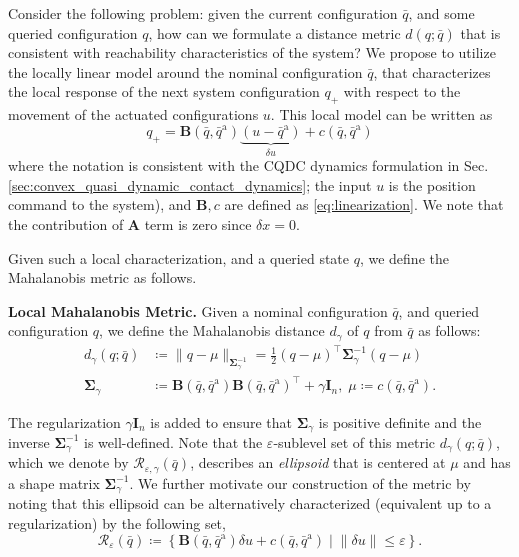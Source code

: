 Consider the following problem: given the current configuration $\bar{q}$, and some queried configuration $q$, how can we formulate a distance metric $d(q;\bar{q})$ that is consistent with reachability characteristics of the system? We propose to utilize the locally linear model around the nominal configuration $\bar{q}$, that characterizes the local response of the next system configuration $q_+$ with respect to the movement of the actuated configurations $u$. This local model can be written as 
\begin{equation}
    q_+ = \mathbf{B}(\bar{q},\bar{q}^{\mathrm{a}})\underbrace{(u - \bar{q}^\mathrm{a})}_{\delta u} + c(\bar{q},\bar{q}^{\mathrm{a}})
\end{equation}
where the notation is consistent with the CQDC dynamics formulation in Sec.\ref{sec:convex_quasi_dynamic_contact_dynamics}; the input $u$ is the position command to the system), and $\mathbf{B},c$ are defined as \eqref{eq:linearization}. We note that the contribution of $\mathbf{A}$ term is zero since $\delta x = 0$.

Given such a local characterization, and a queried state $q$, we define the Mahalanobis metric as follows.
\begin{definition}
{\bf Local Mahalanobis Metric.}\normalfont \label{def:mahalanobis}
Given a nominal configuration $\bar{q}$, and queried configuration $q$, we define the Mahalanobis distance $d_\gamma$ of $q$ from $\bar{q}$ as follows:
\begin{equation}
\label{eq:metric}
\begin{aligned}
d_{\gamma}(q;\bar{q}) & \coloneqq \|q - \mu\|_{\mathbf{\Sigma}^{-1}_{\gamma}}=\textstyle\frac{1}{2}(q-\mu)^\intercal\mathbf{\Sigma}^{-1}_\gamma (q-\mu) \\
\mathbf{\Sigma}_{\gamma} & \coloneqq \mathbf{B}(\bar{q},\bar{q}^\mathrm{a})\mathbf{B}(\bar{q},\bar{q}^\mathrm{a})^\intercal + \gamma\mathbf{I}_n, \; \mu \coloneqq c(\bar{q},\bar{q}^\mathrm{a}).
\end{aligned}
\end{equation}
\end{definition}

The regularization $\gamma\mathbf{I}_n$ is added to ensure that $\mathbf{\Sigma}_{\gamma}$ is positive definite and the inverse $\mathbf{\Sigma}^{-1}_{\gamma}$ is well-defined. Note that the $\varepsilon$-sublevel set of this metric $d_\gamma(q;\bar{q})$, which we denote by $\mathcal{R}_{\varepsilon,\gamma}(\bar{q})$, describes an \emph{ellipsoid} that is centered at $\mu$ and has a shape matrix $\mathbf{\Sigma}^{-1}_\gamma$. We further motivate our construction of the metric by noting that this ellipsoid can be alternatively characterized (equivalent up to a regularization) by the following set, 
\begin{equation}
    \mathcal{R}_{\varepsilon}(\bar{q})\coloneqq \left\{\mathbf{B}(\bar{q},\bar{q}^{\mathrm{a}}) \delta u + c(\bar{q},\bar{q}^\mathrm{a})\; | \; \|\delta u\|\leq \varepsilon\right\}.
\end{equation}

